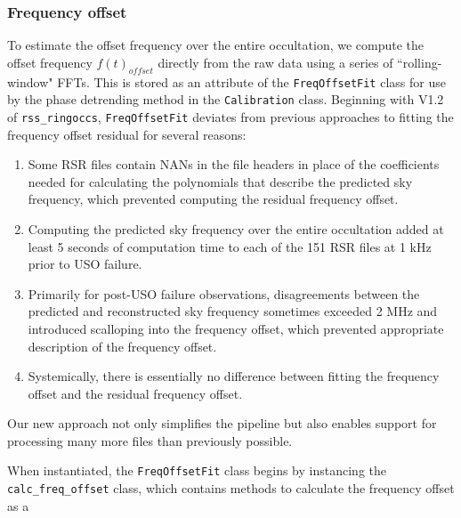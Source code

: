 \documentclass[titlepage, 12pt]{article}
\begin{document}
            \subsubsection{Frequency offset}
            \label{subsubsec: freq_offset}
                To estimate the offset frequency over the entire
                occultation, we compute the offset frequency $f(t)_{offset}$
                directly from the raw data using a series of ``rolling-window"
                FFTs. This is stored
                as an attribute of the \texttt{FreqOffsetFit} class for use by
                the phase detrending method in the \texttt{Calibration} class.
                Beginning with V1.2 of \texttt{rss\_ringoccs}, \texttt{FreqOffsetFit} deviates from previous approaches to
                fitting the frequency offset residual for several reasons: 
                \begin{enumerate}
                \item Some RSR files contain NANs in the file headers in place of the
                coefficients needed for calculating the polynomials that describe
                the predicted sky frequency, which prevented computing the residual
                frequency offset. 
                \item Computing the predicted sky frequency over
                the entire occultation added at least 5 seconds of computation time
                to each of the 151 RSR files at 1 kHz prior to USO failure. 
                \item Primarily for post-USO failure observations, disagreements between the predicted and reconstructed sky frequency
                sometimes exceeded 2 MHz and introduced scalloping into the frequency
                offset, which prevented appropriate description of the frequency offset.
                \item Systemically, there is essentially no difference between fitting
                the frequency offset and the residual frequency offset. 
                \end{enumerate}
                Our new approach not only simplifies the pipeline
                but also enables support for processing many more files than
                previously possible.
                \par\hfill\par
                When instantiated, the \texttt{FreqOffsetFit} class begins by
                instancing the \texttt{calc\_freq\_offset} class, which
                contains methods to calculate the frequency offset as a
\end{document}
